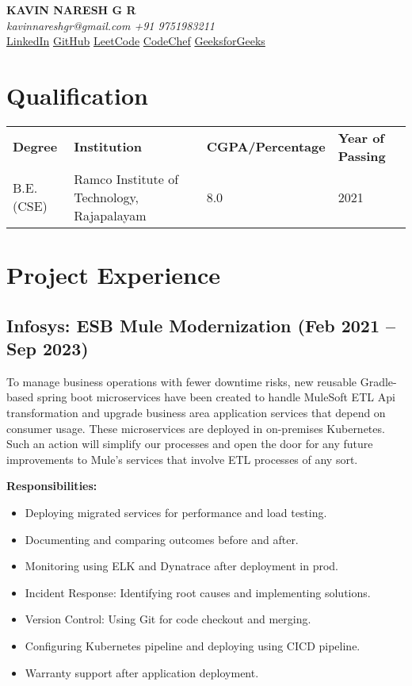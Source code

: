 \documentclass[letterpaper,10pt]{article}
\begin{document}
\pagestyle{empty} %

\begin{center}
\textbf{\LARGE KAVIN NARESH G R} \\
\textit{kavinnareshgr@gmail.com \quad +91 9751983211} \\
\href{https://www.linkedin.com/in/kavin-naresh-g-r/}{LinkedIn} \quad \href{https://github.com/kavin-naresh}{GitHub} \quad \href{https://leetcode.com/kavinnareshgr/}{LeetCode} \quad \href{https://www.codechef.com/users/kavinnaresh/}{CodeChef} \quad \href{https://auth.geeksforgeeks.org/user/kavinnan6sj}{GeeksforGeeks}
\end{center}

\section*{Qualification}
\begin{tabular}{l l l l}
\textbf{Degree} & \textbf{Institution} & \textbf{CGPA/Percentage} & \textbf{Year of Passing} \\
B.E.(CSE) & Ramco Institute of Technology, Rajapalayam & 8.0 & 2021 \\
\end{tabular}

\section*{Project Experience}

\subsection*{Infosys: ESB Mule Modernization (Feb 2021 -- Sep 2023)}
To manage business operations with fewer downtime risks, new reusable Gradle-based spring boot microservices have been created to handle MuleSoft ETL Api transformation and upgrade business area application services that depend on consumer usage. These microservices are deployed in on-premises Kubernetes. Such an action will simplify our processes and open the door for any future improvements to Mule's services that involve ETL processes of any sort.

\textbf{Responsibilities:}
\begin{itemize}[left=0pt, label={}]
    \item Deploying migrated services for performance and load testing.
    \item Documenting and comparing outcomes before and after.
    \item Monitoring using ELK and Dynatrace after deployment in prod.
    \item Incident Response: Identifying root causes and implementing solutions.
    \item Version Control: Using Git for code checkout and merging.
    \item Configuring Kubernetes pipeline and deploying using CICD pipeline.
    \item Warranty support after application deployment.
\end{itemize}
\end{document}
